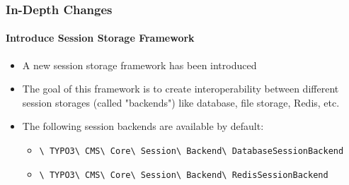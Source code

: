 
\begin{frame}[fragile]
	\frametitle{In-Depth Changes}
	\framesubtitle{Introduce Session Storage Framework}

	\begin{itemize}
		\item A new session storage framework has been introduced
		\item The goal of this framework is to create interoperability between different session storages
			(called "backends") like database, file storage, Redis, etc.
		\item The following session backends are available by default:

			\begin{itemize}
				\item
					\smaller\texttt{\textbackslash
						TYPO3\textbackslash
						CMS\textbackslash
						Core\textbackslash
						Session\textbackslash
						Backend\textbackslash
						DatabaseSessionBackend}

				\item
					\texttt{\textbackslash
						TYPO3\textbackslash
						CMS\textbackslash
						Core\textbackslash
						Session\textbackslash
						Backend\textbackslash
						RedisSessionBackend}
			\end{itemize}
	\end{itemize}

\end{frame}


